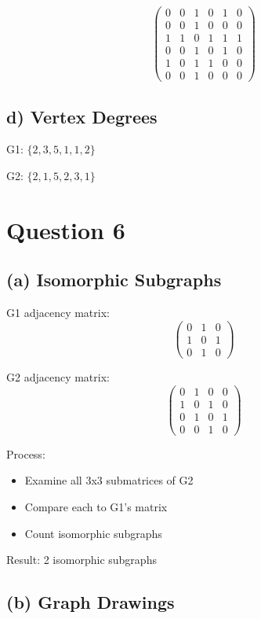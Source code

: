 \documentclass{article}
\begin{document}
\[
\begin{pmatrix}
0 & 0 & 1 & 0 & 1 & 0 \\
0 & 0 & 1 & 0 & 0 & 0 \\
1 & 1 & 0 & 1 & 1 & 1 \\
0 & 0 & 1 & 0 & 1 & 0 \\
1 & 0 & 1 & 1 & 0 & 0 \\
0 & 0 & 1 & 0 & 0 & 0
\end{pmatrix}
\]

\subsection*{d) Vertex Degrees}

G1: $\{2, 3, 5, 1, 1, 2\}$

G2: $\{2, 1, 5, 2, 3, 1\}$

\section*{Question 6}

\subsection*{(a) Isomorphic Subgraphs}

G1 adjacency matrix:
\[
\begin{pmatrix}
0 & 1 & 0 \\
1 & 0 & 1 \\
0 & 1 & 0
\end{pmatrix}
\]

G2 adjacency matrix:
\[
\begin{pmatrix}
0 & 1 & 0 & 0 \\
1 & 0 & 1 & 0 \\
0 & 1 & 0 & 1 \\
0 & 0 & 1 & 0
\end{pmatrix}
\]

Process:
\begin{itemize}
\item Examine all 3x3 submatrices of G2
\item Compare each to G1's matrix
\item Count isomorphic subgraphs
\end{itemize}

Result: 2 isomorphic subgraphs

\subsection*{(b) Graph Drawings}

\end{document}
